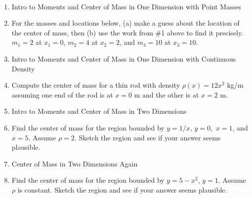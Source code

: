 \documentclass[11pt,fleqn]{article}
\begin{document}
\renewcommand{\headrulewidth}{0pt}
\newcommand{\blank}[1]{\rule{#1}{0.75pt}}
\newcommand{\bc}{\begin{center}}
\newcommand{\ec}{\end{center}}
\renewcommand{\d}{\displaystyle}

\vspace*{-0.7in}

\begin{center}
  \large
  \\
   
\end{center}

\begin{enumerate}
\item Intro to Moments and Center of Mass in One Dimension with Point Masses
\vfill

\item For the masses and locations below, (a) make a guess about the location of the center of mass, then (b) use the work from \#1 above to find it precisely.\\

$m_1=2$ at $x_1=0$, $m_2=4$ at $x_2=2$, and $m_3=10$ at $x_3=10.$

\vfill
\item Intro to Moments and Center of Mass in One Dimension with Continuous Density
\vfill
\item Compute the center of mass for a thin rod with density $\rho(x)=12{x^2}$ kg/m assuming one end of the rod is at $x=0$ m  and the other is at $x=2$ m. 
\vfill
\newpage
\item Intro to Moments and Center of Mass in Two Dimensions
\vfill
\item Find the center of mass for the region bounded by $y=1/x$, $y=0,$ $x=1$, and $x=5.$ Assume $\rho=2.$ Sketch the region and see if your answer seems plausible.
\vfill
\newpage
\item Center of Mass in Two Dimensions Again
\vfill

\item Find the center of mass for the region bounded by $y=5-x^2$, $y=1$. Assume $\rho$ is constant. Sketch the region and see if your answer seems plausible.
\vfill
\end{enumerate}
\end{document}
